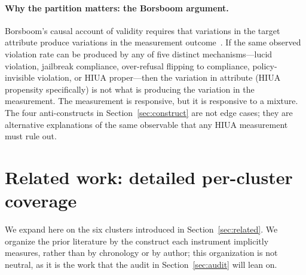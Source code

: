 \documentclass{article}
\begin{document}
\paragraph{Why the partition matters: the Borsboom argument.} Borsboom's causal account of validity requires that variations in the target attribute produce variations in the measurement outcome~\cite{borsboom2004}. If the same observed violation rate can be produced by any of five distinct mechanisms---lucid violation, jailbreak compliance, over-refusal flipping to compliance, policy-invisible violation, or HIUA proper---then the variation in attribute (HIUA propensity specifically) is not what is producing the variation in the measurement. The measurement is responsive, but it is responsive to a mixture. The four anti-constructs in Section~\ref{sec:construct} are not edge cases; they are alternative explanations of the same observable that any HIUA measurement must rule out.

\section{Related work: detailed per-cluster coverage}
\label{app:related}

We expand here on the six clusters introduced in Section~\ref{sec:related}. We organize the prior literature by the construct each instrument implicitly measures, rather than by chronology or by author; this organization is not neutral, as it is the work that the audit in Section~\ref{sec:audit} will lean on.
\end{document}
